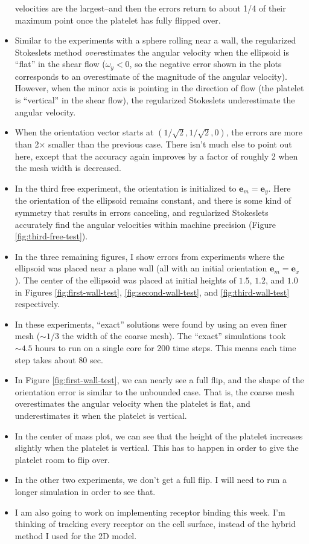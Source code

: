 \documentclass{article}
\newcommand{\vect}[1]{\boldsymbol{\mathbf{#1}}}
\begin{document}
\begin{itemize}
  velocities are the largest--and then the errors return to about 1/4
  of their maximum point once the platelet has fully flipped over.
\item Similar to the experiments with a sphere rolling near a wall,
  the regularized Stokeslets method \emph{over}estimates the angular
  velocity when the ellipsoid is ``flat'' in the shear flow ($\omega_y
  < 0$, so the negative error shown in the plots corresponds to an
  overestimate of the magnitude of the angular velocity). However,
  when the minor axis is pointing in the direction of flow (the
  platelet is ``vertical'' in the shear flow), the regularized
  Stokeslets underestimate the angular velocity.
\item When the orientation vector starts at $(1/\sqrt{2}, 1/\sqrt{2},
  0)$, the errors are more than 2$\times$ smaller than the previous
  case. There isn't much else to point out here, except that the
  accuracy again improves by a factor of roughly 2 when the mesh width
  is decreased.
\item In the third free experiment, the orientation is initialized to
  $\vect{e}_m = \vect{e}_y$. Here the orientation of the ellipsoid
  remains constant, and there is some kind of symmetry that results in
  errors canceling, and regularized Stokeslets accurately find the
  angular velocities within machine precision (Figure
  \ref{fig:third-free-test}). 
\item In the three remaining figures, I show errors from experiments
  where the ellipsoid was placed near a plane wall (all with an
  initial orientation $\vect{e}_m = \vect{e}_x$). The center of the
  ellipsoid was placed at initial heights of $1.5$, $1.2$, and $1.0$
  in Figures \ref{fig:first-wall-test}, \ref{fig:second-wall-test},
  and \ref{fig:third-wall-test} respectively.
\item In these experiments, ``exact'' solutions were found by using an
  even finer mesh ($\sim 1/3$ the width of the coarse mesh). The
  ``exact'' simulations took $\sim 4.5$ hours to run on a single core
  for 200 time steps. This means each time step takes about 80 sec.
\item In Figure \ref{fig:first-wall-test}, we can nearly see a full
  flip, and the shape of the orientation error is similar to the
  unbounded case. That is, the coarse mesh overestimates the angular
  velocity when the platelet is flat, and underestimates it when the
  platelet is vertical.
\item In the center of mass plot, we can see that the height of the
  platelet increases slightly when the platelet is vertical. This has
  to happen in order to give the platelet room to flip over.
\item In the other two experiments, we don't get a full flip. I will
  need to run a longer simulation in order to see that.
\item I am also going to work on implementing receptor binding this
  week. I'm thinking of tracking every receptor on the cell surface,
  instead of the hybrid method I used for the 2D model. 
\end{itemize}
\end{document}
